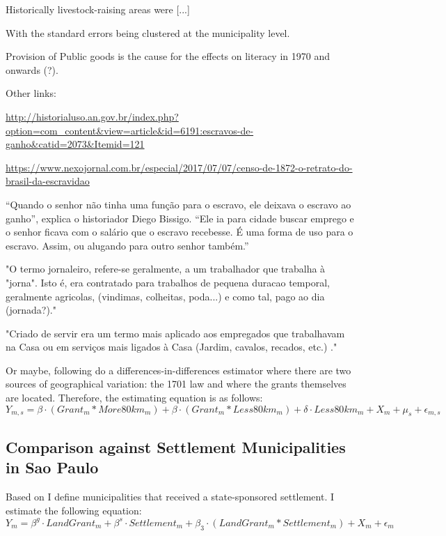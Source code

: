 \documentclass{article}
\begin{document}
Historically livestock-raising areas were [...]

With the standard errors being clustered at the municipality level. 


Provision of Public goods is the cause for the effects on literacy in 1970 and onwards (?).

Other links:

\url{http://historialuso.an.gov.br/index.php?option=com_content&view=article&id=6191:escravos-de-ganho&catid=2073&Itemid=121}

\url{https://www.nexojornal.com.br/especial/2017/07/07/censo-de-1872-o-retrato-do-brasil-da-escravidao}

“Quando o senhor não tinha uma função para o escravo, ele deixava o escravo ao ganho”, explica o historiador Diego Bissigo. “Ele ia para cidade buscar emprego e o senhor ficava com o salário que o escravo recebesse. É uma forma de uso para o escravo. Assim, ou alugando para outro senhor também.”

"O termo jornaleiro, refere-se geralmente, a um trabalhador que trabalha à "jorna". Isto é, era contratado para trabalhos de pequena duracao temporal, geralmente agricolas, (vindimas, colheitas, poda...) e como tal, pago ao dia (jornada?)."

"Criado de servir era um termo mais aplicado aos empregados que trabalhavam na Casa ou em serviços mais ligados à Casa (Jardim, cavalos, recados, etc.) ."

\parencite[p.~142]{De_Oliveira_Andrade1980-xz}

Or maybe, following \textcite{Barsanetti2021-hp} do a differences-in-differences estimator where there are two sources of geographical variation: the 1701 law and where the grants themselves are located. Therefore, the estimating equation is as follows:
\begin{equation}
  \label{eqn:livestock}
  Y_{m,s} = \beta \cdot (Grant_m  * More80km_m) + \beta \cdot (Grant_m * Less80km_m) + \delta \cdot  Less80km_m + X_{m} + \mu_s + \epsilon_{m,s}
\end{equation}

\subsection{Comparison against Settlement Municipalities in Sao Paulo}

Based on \textcite{Rocha2017-yq} I define municipalities that received a state-sponsored settlement. I estimate the following equation:
\begin{equation}
  \label{eqn:settlement}
  Y_m = \beta^g \cdot LandGrant_m + \beta^s \cdot Settlement_m + \beta_3 \cdot (LandGrant_m * Settlement_m) + X_m + \epsilon_m
\end{equation}
\end{document}
